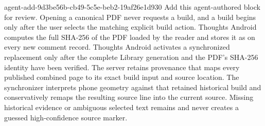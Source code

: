 \agentProposedEdit
  {agent-add-9d3be56b-cb49-5c5e-beb2-19af26e1d930}
  {Add this agent-authored block for review.}
  {}
  {Opening a canonical PDF never requests a build, and a build begins only after the user selects the matching explicit build action.
Thoughts Android computes the full SHA-256 of the PDF loaded by the reader and stores it as  on every new comment record.
Thoughts Android activates a synchronized replacement only after the complete Library generation and the PDF's SHA-256 identity have been verified.
The server retains provenance that maps every published combined page to its exact build input and source location.
The synchronizer interprets phone geometry against that retained historical build and conservatively remaps the resulting source line into the current source.
Missing historical evidence or ambiguous selected text remains  and never creates a guessed high-confidence source marker.}

